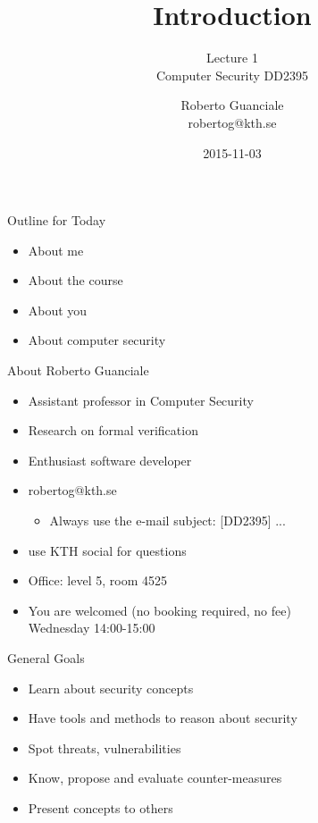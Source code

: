 \documentclass{beamer}
\title{Introduction}
\subtitle{Lecture 1 \\ Computer Security DD2395}
\author[R. Guanciale]{
  Roberto Guanciale\\
  robertog@kth.se
}
\date{2015-11-03}
\begin{document}
\begin{frame}[plain]
  \titlepage
\end{frame}

\begin{frame}{Outline for Today}
  \begin{itemize}
    \item About me
    \item About the course
    \item About you
    \item About computer security
  \end{itemize}
\end{frame}

\begin{frame}{About Roberto Guanciale}
  \begin{itemize}
    \item Assistant professor in Computer Security
    \item Research on formal verification
    \item Enthusiast software developer
    \item robertog@kth.se
      \begin{itemize}
      \item \alert{Always} use the e-mail subject: [DD2395] ...
      \end{itemize}
    \item use KTH social for questions
    \item Office: level 5, room 4525
    \item You are welcomed (no booking required, no fee)\\
      Wednesday 14:00-15:00
  \end{itemize}
\end{frame}

\begin{frame}{General Goals}
  \begin{itemize}
    \item Learn about security concepts
    \item Have tools and methods to reason about security
    \item Spot threats, vulnerabilities
    \item Know, propose and evaluate counter-measures
    \item Present concepts to others 
  \end{itemize}
\end{frame}
\end{document}
